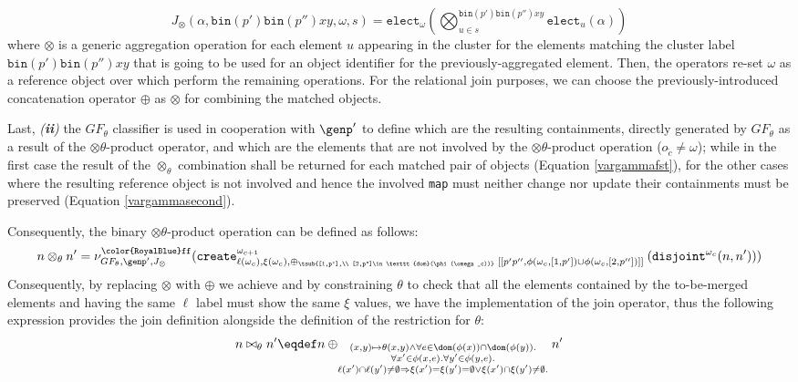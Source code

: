 \[J_\otimes(\alpha,\texttt{bin}(p')\texttt{bin}(p'')xy,\omega,s)=\texttt{elect}_{\omega}\left(\bigotimes^{\texttt{bin}(p')\texttt{bin}(p'')xy}_{u\in s}\texttt{elect}_u(\alpha)\right)\]
where $\otimes$ is a generic aggregation operation for each element $u$ appearing in the cluster for the elements matching the cluster label $\texttt{bin}(p')\texttt{bin}(p'')xy$ that is going to be used for an object identifier for the previously-aggregated element. Then, the operators re-set $\omega$ as a reference object over which perform the remaining operations. 
For the relational join purposes, we can choose the previously-introduced  concatenation operator $\oplus$ as $\otimes$ for combining the matched objects. 
\medskip

Last, \textit{(\textbf{ii})} the $GF_\theta$ classifier is used in cooperation with $\genp'$ to define which are the resulting containments, directly generated by $GF_\theta$ as a result of the $\otimes\theta$-product operator, and which are the elements that are not involved by the $\otimes\theta$-product operation ($o_{\tilde{c}}\neq \omega$); while in the first case the result of the $\otimes_\theta$ combination shall be returned for each matched pair of objects (Equation \ref{vargammafst}), for the other cases where the resulting reference object is not involved and hence the involved \texttt{map} must neither change nor update their containments must be preserved (Equation \ref{vargammasecond}). 
Consequently, the binary $\otimes\theta$-product operation can be defined as follows:
\[n \otimes_\theta n'=\nu_{GF_\theta,\genp',J_\otimes}^{\texttt{\color{RoyalBlue}ff}}(\texttt{create}^{\omega_{c+1}}_{\ell(\omega_c),\xi(\omega_c),\oplus_{\tsub{[1,p'],\\ [2,p'']\in\texttt{dom}(\phi(\omega_c))}}\;[[p'p'', \phi(\omega_c,[1,p'])\cup \phi(\omega_c,[2,p''])]]\;}(\texttt{disjoint}^{\omega_c}(n,n')))\]
Consequently, by replacing $\otimes$ with $\oplus$ we achieve and by constraining $\theta$ to check that all the elements contained by the to-be-merged elements and having the same $\ell$ label must show the same $\xi$ values, we have the implementation of the join operator, thus the following expression provides the join definition alongside the definition of the restriction for $\theta$:
\[n \bowtie_\theta n'\eqdef n \oplus_{\substack{(x,y)\mapsto\theta(x,y)\wedge \forall e\in\dom(\phi(x))\cap\dom(\phi(y)).\\\forall x'\in\phi(x,e).\forall y'\in \phi(y,e).\\ \ell(x')\cap\ell(y')\neq \emptyset\Rightarrow \xi(x')=\xi(y')=\emptyset \vee \xi(x')\cap\xi(y')\neq\emptyset. }} n' \]
%

